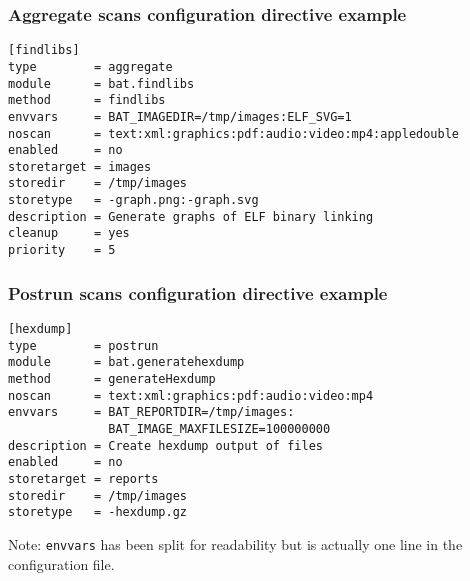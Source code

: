 \documentclass[11pt]{beamer}
\begin{document}
\begin{frame}[fragile]
\frametitle{Aggregate scans configuration directive example}
\begin{verbatim}
[findlibs]
type        = aggregate
module      = bat.findlibs
method      = findlibs
envvars     = BAT_IMAGEDIR=/tmp/images:ELF_SVG=1
noscan      = text:xml:graphics:pdf:audio:video:mp4:appledouble
enabled     = no
storetarget = images
storedir    = /tmp/images
storetype   = -graph.png:-graph.svg
description = Generate graphs of ELF binary linking
cleanup     = yes
priority    = 5
\end{verbatim}
\end{frame}

\begin{frame}[fragile]
\frametitle{Postrun scans configuration directive example}
\begin{verbatim}
[hexdump]
type        = postrun
module      = bat.generatehexdump
method      = generateHexdump
noscan      = text:xml:graphics:pdf:audio:video:mp4
envvars     = BAT_REPORTDIR=/tmp/images:
              BAT_IMAGE_MAXFILESIZE=100000000
description = Create hexdump output of files
enabled     = no
storetarget = reports
storedir    = /tmp/images
storetype   = -hexdump.gz
\end{verbatim}

Note: \texttt{envvars} has been split for readability but is actually one line in the configuration file.
\end{frame}


\end{document}
